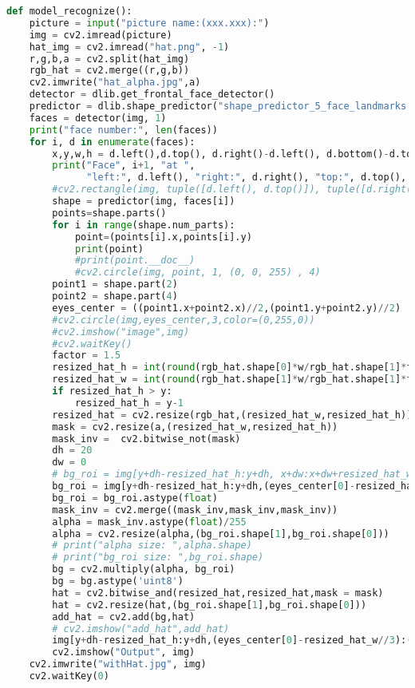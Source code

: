 \documentclass{article}
\begin{document}
		\begin{lstlisting}[language=Python]
def model_recognize():
    picture = input("picture name:(xxx.xxx):")
    img = cv2.imread(picture)
    hat_img = cv2.imread("hat.png", -1)
    r,g,b,a = cv2.split(hat_img) 
    rgb_hat = cv2.merge((r,g,b))
    cv2.imwrite("hat_alpha.jpg",a)
    detector = dlib.get_frontal_face_detector()
    predictor = dlib.shape_predictor("shape_predictor_5_face_landmarks.dat")
    faces = detector(img, 1)
    print("face number:", len(faces))
    for i, d in enumerate(faces):
        x,y,w,h = d.left(),d.top(), d.right()-d.left(), d.bottom()-d.top()
        print("Face", i+1, "at ",
              "left:", d.left(), "right:", d.right(), "top:", d.top(), "bottom:", d.bottom())
        #cv2.rectangle(img, tuple([d.left(), d.top()]), tuple([d.right(), d.bottom()]), (0, 255, 255), 2)
        shape = predictor(img, faces[i])
        points=shape.parts()
        for i in range(shape.num_parts):
            point=(points[i].x,points[i].y)
            print(point)
            #print(point.__doc__)
            #cv2.circle(img, point, 1, (0, 0, 255) , 4)
        point1 = shape.part(2)
        point2 = shape.part(4)
        eyes_center = ((point1.x+point2.x)//2,(point1.y+point2.y)//2)
        #cv2.circle(img,eyes_center,3,color=(0,255,0))  
        #cv2.imshow("image",img)
        #cv2.waitKey()
        factor = 1.5
        resized_hat_h = int(round(rgb_hat.shape[0]*w/rgb_hat.shape[1]*factor))
        resized_hat_w = int(round(rgb_hat.shape[1]*w/rgb_hat.shape[1]*factor))
        if resized_hat_h > y:
            resized_hat_h = y-1
        resized_hat = cv2.resize(rgb_hat,(resized_hat_w,resized_hat_h))
        mask = cv2.resize(a,(resized_hat_w,resized_hat_h))
        mask_inv =  cv2.bitwise_not(mask)
        dh = 20
        dw = 0
        # bg_roi = img[y+dh-resized_hat_h:y+dh, x+dw:x+dw+resized_hat_w]
        bg_roi = img[y+dh-resized_hat_h:y+dh,(eyes_center[0]-resized_hat_w//3):(eyes_center[0]+resized_hat_w//3*2)]
        bg_roi = bg_roi.astype(float)
        mask_inv = cv2.merge((mask_inv,mask_inv,mask_inv))
        alpha = mask_inv.astype(float)/255
        alpha = cv2.resize(alpha,(bg_roi.shape[1],bg_roi.shape[0]))
        # print("alpha size: ",alpha.shape)
        # print("bg_roi size: ",bg_roi.shape)
        bg = cv2.multiply(alpha, bg_roi)
        bg = bg.astype('uint8')
        hat = cv2.bitwise_and(resized_hat,resized_hat,mask = mask)
        hat = cv2.resize(hat,(bg_roi.shape[1],bg_roi.shape[0]))
        add_hat = cv2.add(bg,hat)
        # cv2.imshow("add_hat",add_hat) 
        img[y+dh-resized_hat_h:y+dh,(eyes_center[0]-resized_hat_w//3):(eyes_center[0]+resized_hat_w//3*2)] = add_hat
        cv2.imshow("Output", img)
    cv2.imwrite("withHat.jpg", img)
    cv2.waitKey(0)
	    	\end{lstlisting}
\end{document}
